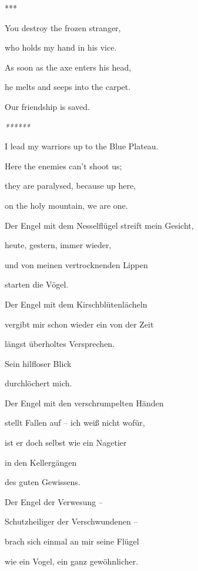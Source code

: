 \documentclass[a4paper]{article}
\begin{document}
***

You destroy the frozen stranger,

who holds my hand in his vice.

As soon as the axe enters his head,

he melts and seeps into the carpet.

Our friendship is saved.


\bigskip

{\itshape
******}


\bigskip


\bigskip

I lead my warriors up to the Blue Plateau.

Here the enemies can’t shoot us;

they are paralysed, because up here, 

on the holy mountain, we are one.


\bigskip


\bigskip



\bigskip

Der Engel mit dem Nesselflügel streift mein Gesicht,

heute, gestern, immer wieder,

und von meinen vertrocknenden Lippen

starten die Vögel.


\bigskip

Der Engel mit dem Kirschblütenlächeln

vergibt mir schon wieder ein von der Zeit 

längst überholtes Versprechen.

Sein hilfloser Blick 

durchlöchert mich.


\bigskip

Der Engel mit den verschrumpelten Händen

stellt Fallen auf – ich weiß nicht wofür,

ist er doch selbst wie ein Nagetier

in den Kellergängen 

des guten Gewissens.


\bigskip

Der Engel der Verwesung – 

Schutzheiliger der Verschwundenen –

brach sich einmal an mir seine Flügel

wie ein Vogel, ein ganz gewöhnlicher.
\end{document}
